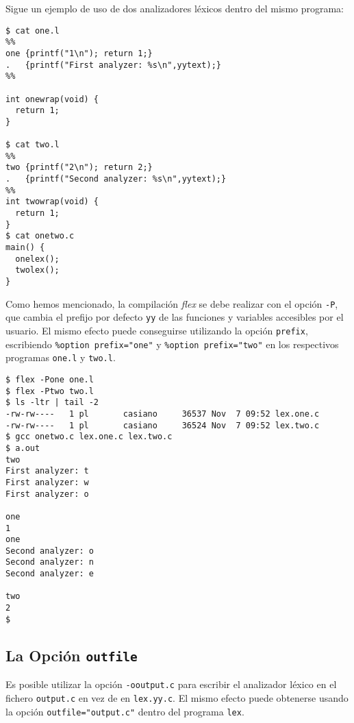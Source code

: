 Sigue un ejemplo de uso de dos analizadores l\'exicos dentro del mismo programa:
\begin{verbatim}
$ cat one.l
%%
one {printf("1\n"); return 1;}
.   {printf("First analyzer: %s\n",yytext);}
%%
 
int onewrap(void) {
  return 1;
}
 
$ cat two.l
%%
two {printf("2\n"); return 2;}
.   {printf("Second analyzer: %s\n",yytext);}
%%
int twowrap(void) {
  return 1;
}
$ cat onetwo.c
main() {
  onelex();
  twolex();
}                                 
\end{verbatim}
Como hemos mencionado, la compilaci\'on \emph{flex} se debe realizar con el opci\'on \verb|-P|,
que cambia el prefijo por defecto \verb|yy| de las funciones
y variables accesibles por el usuario.
El mismo efecto puede conseguirse utilizando la opción \verb|prefix|, escribiendo
\verb|%option prefix="one"| y \verb|%option prefix="two"| en los respectivos programas 
\verb|one.l| y \verb|two.l|. 
\begin{verbatim}
$ flex -Pone one.l
$ flex -Ptwo two.l
$ ls -ltr | tail -2
-rw-rw----   1 pl       casiano     36537 Nov  7 09:52 lex.one.c
-rw-rw----   1 pl       casiano     36524 Nov  7 09:52 lex.two.c
$ gcc onetwo.c lex.one.c lex.two.c
$ a.out
two
First analyzer: t
First analyzer: w
First analyzer: o
 
one
1
one
Second analyzer: o
Second analyzer: n
Second analyzer: e
 
two
2
$             
\end{verbatim}

\subsection{La Opción {\tt outfile}}
Es posible utilizar la opción \verb|-ooutput.c|  para escribir el 
analizador léxico en el fichero \verb|output.c| en vez de  en \verb|lex.yy.c|.
El mismo efecto puede obtenerse usando la opción \verb|outfile="output.c"| dentro
del programa \verb|lex|.

